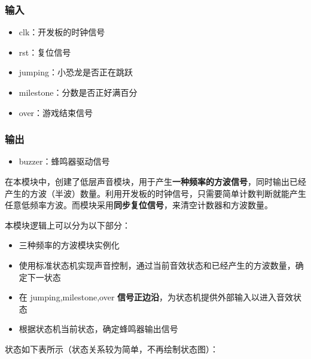 \documentclass[hyperref,UTF8,12pt,a4paper]{ctexart}
\providecommand{\tightlist}{%
  \setlength{\itemsep}{0pt}\setlength{\parskip}{0pt}}
\begin{document}
\hypertarget{ux8f93ux5165-7}{%
\subsubsection{输入}\label{ux8f93ux5165-7}}

\begin{itemize}
\tightlist
\item
  clk：开发板的时钟信号
\item
  rst：复位信号
\item
  jumping：小恐龙是否正在跳跃
\item
  milestone：分数是否正好满百分
\item
  over：游戏结束信号
\end{itemize}

\hypertarget{ux8f93ux51fa-7}{%
\subsubsection{输出}\label{ux8f93ux51fa-7}}

\begin{itemize}
\tightlist
\item
  buzzer：蜂鸣器驱动信号
\end{itemize}

在本模块中，创建了低层声音模块，用于产生\textbf{一种频率的方波信号}，同时输出已经产生的方波（半波）数量。利用开发板的时钟信号，只需要简单计数判断就能产生任意低频率方波。而模块采用\textbf{同步复位信号}，来清空计数器和方波数量。

本模块逻辑上可以分为以下部分：

\begin{itemize}
\tightlist
\item
  三种频率的方波模块实例化
\item
  使用标准状态机实现声音控制，通过当前音效状态和已经产生的方波数量，确定下一状态
\item
  在 jumping,milestone,over
  \textbf{信号正边沿}，为状态机提供外部输入以进入音效状态
\item
  根据状态机当前状态，确定蜂鸣器输出信号
\end{itemize}

状态如下表所示（状态关系较为简单，不再绘制状态图）：
\end{document}
